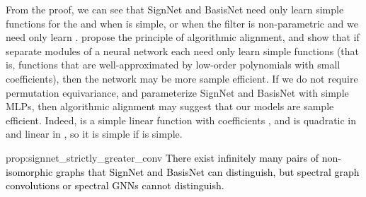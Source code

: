 \documentclass{article} \usepackage{iclr2023_conference,times}
\newcommand{\rebut}[1]{\textcolor{black}{#1}}
\begin{document}
From the proof, we can see that SignNet and BasisNet need only learn simple functions for the  and  when  is simple, or when the filter is non-parametric and we need only learn . \cite{xu2019can} propose the principle of algorithmic alignment, and show that if separate modules of a neural network each need only learn simple functions (that is, functions that are well-approximated by low-order polynomials with small coefficients), then the network may be more sample efficient. If we do not require permutation equivariance, and parameterize SignNet and BasisNet with simple MLPs, then algorithmic alignment may suggest that our models are sample efficient. Indeed,  is a simple linear function with coefficients , and  is quadratic in  and linear in , so it is simple if  is simple.

\begin{repproposition}{prop:signnet_strictly_greater_conv}
\rebut{There exist infinitely many pairs of non-isomorphic graphs that SignNet and BasisNet can distinguish, but spectral graph convolutions or spectral GNNs cannot distinguish.}
\end{repproposition}
\end{document}
